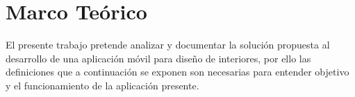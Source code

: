 \chapter{Marco Teórico } %
	El presente trabajo pretende analizar y documentar la solución propuesta al desarrollo de una aplicación móvil para diseño de interiores, por ello las definiciones que a continuación se exponen son necesarias para entender objetivo y el funcionamiento de la aplicación presente.
	